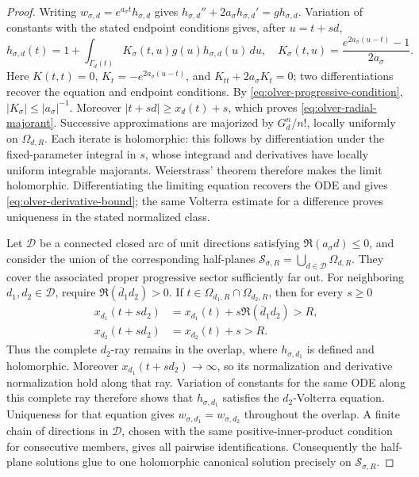 \documentclass[11pt]{article}
\theoremstyle{remark}
\begin{document}
\begin{proof}
Writing \(w_{\sigma,d}=e^{a_\sigma t}h_{\sigma,d}\) gives
\(h_{\sigma,d}''+2a_\sigma h_{\sigma,d}'=g h_{\sigma,d}\).  Variation of constants
with the stated endpoint conditions gives, after \(u=t+sd\),
\begin{equation}
 h_{\sigma,d}(t)=1+\int_{\Gamma_d(t)}K_\sigma(t,u)g(u)h_{\sigma,d}(u)\,du,
 \quad K_\sigma(t,u)=\frac{e^{2a_\sigma(u-t)}-1}{2a_\sigma}.
 \label{eq:olver-volterra}
\end{equation}
Here \(K(t,t)=0\), \(K_t=-e^{2a_\sigma(u-t)}\), and
\(K_{tt}+2a_\sigma K_t=0\); two differentiations recover the equation and
endpoint conditions.  By \eqref{eq:olver-progressive-condition},
\(|K_\sigma|\leq|a_\sigma|^{-1}\).  Moreover
\(|t+sd|\geq x_d(t)+s\), which proves \eqref{eq:olver-radial-majorant}.
Successive approximations are majorized by \(G_d^n/n!\), locally uniformly
on \(\Omega_{d,R}\).  Each iterate is holomorphic: this follows by
differentiation under the fixed-parameter integral in \(s\), whose integrand
and derivatives have locally uniform integrable majorants.  Weierstrass'
theorem therefore makes the limit holomorphic.  Differentiating the limiting
equation recovers the ODE and gives \eqref{eq:olver-derivative-bound}; the
same Volterra estimate for a difference proves uniqueness in the stated
normalized class.

Let \(\mathcal D\) be a connected closed arc of unit directions satisfying
\(\Re(a_\sigma d)\leq0\), and consider the union of the corresponding
half-planes \(\mathcal S_{\sigma,R}=\bigcup_{d\in\mathcal D}\Omega_{d,R}\).
They cover the associated proper progressive sector sufficiently far out.
For neighboring \(d_1,d_2\in\mathcal D\), require
\(\Re(\overline d_1d_2)>0\).  If
\(t\in\Omega_{d_1,R}\cap\Omega_{d_2,R}\), then for every \(s\geq0\)
\begin{align}
 x_{d_1}(t+sd_2)&=x_{d_1}(t)
   +s\Re(\overline d_1d_2)>R,\nonumber\\
 x_{d_2}(t+sd_2)&=x_{d_2}(t)+s>R.
 \label{eq:olver-overlap-rays}
\end{align}
Thus the complete \(d_2\)-ray remains in the overlap, where
\(h_{\sigma,d_1}\) is defined and holomorphic.  Moreover
\(x_{d_1}(t+sd_2)\to\infty\), so its normalization and derivative
normalization hold along that ray.  Variation of constants for the same ODE
along this complete ray therefore shows that \(h_{\sigma,d_1}\) satisfies
the \(d_2\)-Volterra equation.  Uniqueness for that equation gives
\(w_{\sigma,d_1}=w_{\sigma,d_2}\) throughout the overlap.  A finite chain
of directions in \(\mathcal D\), chosen with the same positive-inner-product
condition for consecutive members, gives all pairwise identifications.
Consequently the half-plane solutions glue to one holomorphic canonical
solution precisely on \(\mathcal S_{\sigma,R}\).
\end{proof}
\end{document}
